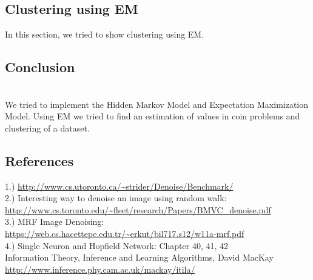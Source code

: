 \documentclass[conference]{IEEEtran}
\begin{document}

\subsection{Clustering using EM}
In this section, we tried to show clustering using EM.\\



\subsection{Conclusion}
\\
We tried to implement the Hidden Markov Model and Expectation Maximization Model. Using EM we tried to find an estimation of values in coin problems and clustering of a dataset.



\subsection{References}
1.) \url{http://www.cs.utoronto.ca/~strider/Denoise/Benchmark/}\\
2.) Interesting way to denoise an image using random walk: \\
\url{http://www.cs.toronto.edu/~fleet/research/Papers/BMVC_denoise.pdf}\\
3.) MRF Image Denoising: \\
\url{https://web.cs.hacettepe.edu.tr/~erkut/bil717.s12/w11a-mrf.pdf}\\
4.) Single Neuron and Hopfield Network: Chapter 40, 41, 42\\
Information Theory, Inference and Learning Algorithms, David MacKay\\
\url{http://www.inference.phy.cam.ac.uk/mackay/itila/}
\end{document}
